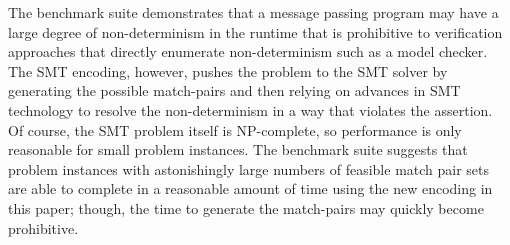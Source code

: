 The benchmark suite demonstrates that a message passing program may
have a large degree of non-determinism in the runtime that is
prohibitive to verification approaches that directly enumerate 
non-determinism such as a model checker. The SMT encoding, however,
pushes the problem to the SMT solver by generating the possible
match-pairs and then relying on advances in SMT technology to resolve
the non-determinism in a way that violates the assertion. Of course,
the SMT problem itself is NP-complete, so performance is only
reasonable for small problem instances. The benchmark suite suggests
that problem instances with astonishingly large numbers of feasible
match pair sets are able to complete in a reasonable amount of time
using the new encoding in this paper; though, the time to generate the
match-pairs may quickly become prohibitive.
